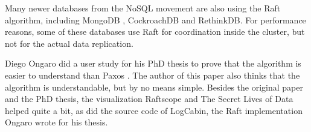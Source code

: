 Many newer databases from the NoSQL movement are also using the Raft algorithm, including MongoDB \cite{mongodb_raft}, CockroachDB\cite{cockroachdb_raft} and RethinkDB\cite{rethinkdb_raft}. For performance reasons, some of these databases use Raft for coordination inside the cluster, but not for the actual data replication\cite[Development section]{rethinkdb_raft_metadata}.

Diego Ongaro did a user study for his PhD thesis to prove that the algorithm is easier to understand than Paxos \cite[Raft user study chapter]{raft_phd_thesis}. The author of this paper also thinks that the algorithm is understandable, but by no means simple. Besides the original paper and the PhD thesis, the visualization Raftscope \cite{raftscope} and The Secret Lives of Data \cite{the_secret_lives_of_data} helped quite a bit, as did the source code of LogCabin\cite{logcabin}, the Raft implementation Ongaro wrote for his thesis.


 


